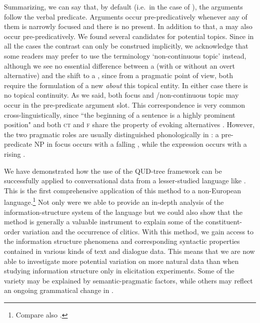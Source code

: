 \documentclass[output=paper
,modfonts
,nonflat]{langsci/langscibook}
\begin{document}
Summarizing, we can say that, by default (i.e.\ in the case of ), the arguments follow the verbal predicate. Arguments occur pre-predicatively whenever any of them is narrowly focused and there is no  present. In addition to that, a  may also occur pre-predicatively. We found several candidates for potential  topics. Since in all the cases the contrast can only be construed implicitly, we acknowledge that some readers may prefer to use the terminology `non-continuous topic' instead, although we see no essential difference between a  (with or without an overt alternative) and the shift to a , since from a pragmatic point of view, both require the formulation of a new  \textit{about} this topical entity. In either case there is no topical continuity. As we said, both focus and /non-continuous topic may occur in the pre-predicate argument slot. This correspondence is very common cross-linguistically, since ``the beginning of a sentence is a highly prominent position" \citep[][139]{kropa04} and both \textsc{ct} and \textsc{f} share the property of evoking alternatives \citep{bueda03}. However, the two pragmatic roles are usually distinguished phonologically in : a pre-predicate NP in focus occurs with a falling , while the  expression occurs with a rising . 

We have demonstrated how the use of the QUD-tree framework can be successfully applied to conversational data from a lesser-studied language like . This is the first comprehensive application of this method to a non-Eu\-ro\-pe\-an language.\footnote{Compare also .} Not only were we able to provide an in-depth analysis of the in\-for\-mat\-ion-struc\-ture system of the language but we could also show that the method is generally a valuable instrument to explain some of the con\-sti\-tu\-ent-or\-der variation and the occurrence of clitics. With this method, we gain access to the information structure phenomena and corresponding syntactic properties contained in various kinds of text and dialogue data. This means that we are now able to investigate more potential variation on more natural data than when studying information structure only in elicitation experiments. Some of the variety may be explained by semantic-pragmatic factors, while others may reflect an ongoing grammatical change in . 
\end{document}
